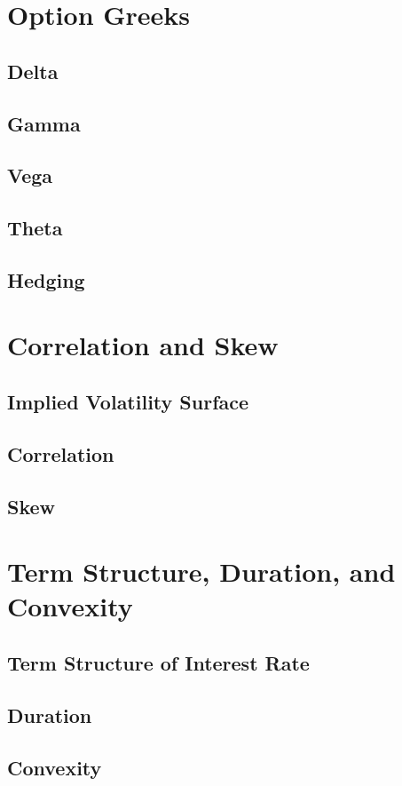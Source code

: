 \section{Option Greeks}
\subsection{Delta}
\subsection{Gamma}
\subsection{Vega}
\subsection{Theta}
\subsection{Hedging}

\section{Correlation and Skew}
\subsection{Implied Volatility Surface}
\subsection{Correlation}
\subsection{Skew}

\section{Term Structure, Duration, and Convexity}
\subsection{Term Structure of Interest Rate}
\subsection{Duration}
\subsection{Convexity}